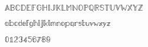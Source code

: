 \documentclass{article}
\begin{document}
$\mathbb{A} \mathbb{B} \mathbb{C} \mathbb{D} \mathbb{E} \mathbb{F} \mathbb{G} \mathbb{H} \mathbb{I} \mathbb{J} \mathbb{K} \mathbb{L} \mathbb{M} \mathbb{N} \mathbb{O} \mathbb{P} \mathbb{Q} \mathbb{R} \mathbb{S} \mathbb{T} \mathbb{U} \mathbb{V} \mathbb{W} \mathbb{X} \mathbb{Y} \mathbb{Z}$

$\mathbb{a} \mathbb{b} \mathbb{c} \mathbb{d} \mathbb{e} \mathbb{f} \mathbb{g} \mathbb{h} \mathbb{i} \mathbb{j} \mathbb{k} \mathbb{l} \mathbb{m} \mathbb{n} \mathbb{o} \mathbb{p} \mathbb{q} \mathbb{r} \mathbb{s} \mathbb{t} \mathbb{u} \mathbb{v} \mathbb{w} \mathbb{x} \mathbb{y} \mathbb{z}$

$\mathbb{0} \mathbb{1} \mathbb{2} \mathbb{3} \mathbb{4} \mathbb{5} \mathbb{6} \mathbb{7} \mathbb{8} \mathbb{9}$
\end{document}
